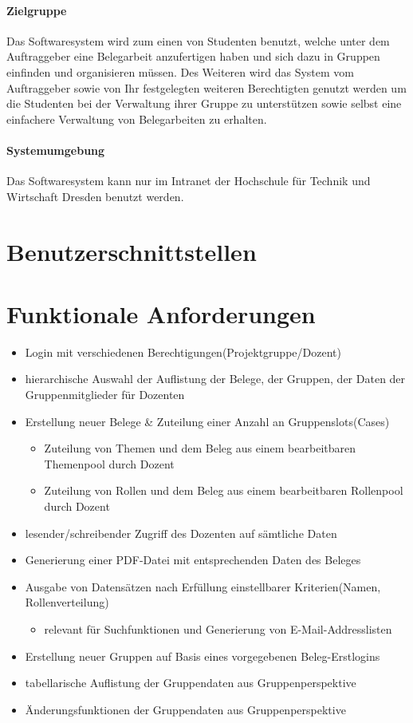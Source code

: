 \documentclass{article}
\begin{document}
\subsection{Zielgruppe}
Das Softwaresystem wird zum einen von Studenten benutzt, welche unter dem Auftraggeber eine Belegarbeit anzufertigen haben und sich dazu in Gruppen einfinden und organisieren müssen.
Des Weiteren wird das System vom Auftraggeber sowie von Ihr festgelegten weiteren Berechtigten genutzt werden um die Studenten bei der Verwaltung ihrer Gruppe zu unterstützen sowie selbst eine einfachere Verwaltung von Belegarbeiten zu erhalten.
\subsection{Systemumgebung}
Das Softwaresystem kann nur im Intranet der Hochschule für Technik und Wirtschaft Dresden benutzt werden. 

\newpage
\part{Benutzerschnittstellen}


\newpage
\part{Funktionale Anforderungen}
\begin{itemize}
\item Login mit verschiedenen Berechtigungen(Projektgruppe/Dozent)
\item hierarchische Auswahl der Auflistung der Belege, der Gruppen, der Daten
der Gruppenmitglieder für Dozenten
\item Erstellung neuer Belege \& Zuteilung einer Anzahl an Gruppenslots(Cases)
\begin{itemize}
\item Zuteilung von Themen und dem Beleg aus einem bearbeitbaren Themenpool durch Dozent
\item Zuteilung von Rollen und dem Beleg aus einem bearbeitbaren Rollenpool durch Dozent
\end{itemize}
\item lesender/schreibender Zugriff des Dozenten auf sämtliche Daten
\item Generierung einer PDF-Datei mit entsprechenden Daten des Beleges
\item Ausgabe von Datensätzen nach Erfüllung einstellbarer Kriterien(Namen,
Rollenverteilung)
\begin{itemize}
\item relevant für Suchfunktionen und Generierung von E-Mail-Addresslisten
\end{itemize}
\end{itemize}
\begin{itemize}
\item Erstellung neuer Gruppen auf Basis eines vorgegebenen Beleg-Erstlogins
\item tabellarische Auflistung der Gruppendaten aus Gruppenperspektive
\item Änderungsfunktionen der Gruppendaten aus Gruppenperspektive
\end{itemize}
\end{document}

